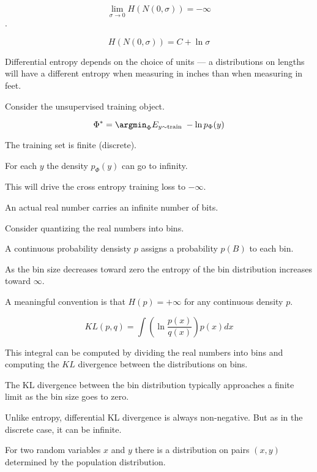 {\vfill
$$\lim_{\sigma \rightarrow 0} H(N(0,\sigma)) = - \infty$$.


$$H(N(0,\sigma)) = C + \ln \sigma$$

\vfill
Differential entropy depends on the choice of units --- a distributions on lengths will have a different entropy
when measuring in inches than when measuring in feet.


Consider the unsupervised training object.

$$\Phi^* = \argmin_\Phi E_{y \sim \mathrm{train}}\;-\ln p_\Phi(y)$$

\vfill
The training set is finite (discrete).

\vfill
For each $y$ the density $p_\Phi(y)$ can go to infinity.

\vfill
This will drive the cross entropy training loss to $-\infty$.


An actual real number carries an infinite number of bits.

\vfill
Consider quantizing the real numbers into bins.

\vfill
A continuous probability densisty $p$ assigns a probability $p(B)$ to each bin.

\vfill
As the bin size decreases toward zero the entropy of the bin distribution increases toward $\infty$.

\vfill
A meaningful convention is that $H(p) = +\infty$ for any continuous density $p$.


$$KL(p,q) = \int \left( \ln \frac{p(x)}{q(x)}\right) p(x) dx$$

\vfill
This integral can be computed by dividing the real numbers into bins and computing the $KL$ divergence between the distributions on bins.

\vfill
The KL divergence between the bin distribution typically approaches a finite limit as the bin size goes to zero.

\vfill
Unlike entropy, differential KL divergence is always non-negative.  But as in the discrete case, it can be infinite.


For two random variables $x$ and $y$ there is a distribution on pairs $(x,y)$ determined by the population distribution.

}
